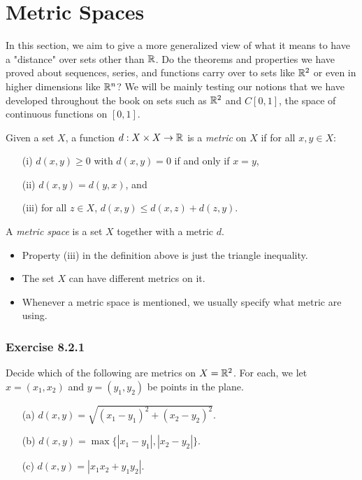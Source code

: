 \section{Metric Spaces}

In this section, we aim to give a more generalized view of what it means to have a "distance" over sets other than \( \mathbb{R}  \). Do the theorems and properties we have proved about sequences, series, and functions carry over to sets like \( \mathbb{R}^{2} \) or even in higher dimensions like \( \mathbb{R}^n \)? We will be mainly testing our notions that we have developed throughout the book on sets such as \( \mathbb{R}^{2} \) and \( C[0,1] \), the space of continuous functions on \( [0,1] \).


\begin{definition}
Given a set \( X  \), a function \( d: X \times X \to \mathbb{R}  \) is a \textit{metric} on \( X  \) if for all \( x,y \in X  \):
\begin{enumerate}
    \item[(i)]\( d(x,y) \geq 0  \) with \( d(x,y) =0  \) if and only if \( x = y  \),
    \item[(ii)] \( d(x,y) = d(y,x)  \), and 
    \item[(iii)] for all \( z \in X \), \( d(x,y) \leq d(x,z) + d(z,y) \).
\end{enumerate}
A \textit{metric space} is a set \( X  \) together with a metric \( d  \).
\end{definition}

\begin{itemize}
    \item Property (iii) in the definition above is just the triangle inequality.
    \item The set \( X  \) can have different metrics on it.
    \item Whenever a metric space is mentioned, we usually specify what metric are using.
\end{itemize}

\subsubsection{Exercise 8.2.1} Decide which of the following are metrics on \( X = \mathbb{R}^2  \). For each, we let \( x = (x_{1}, x_{2}) \) and \( y = (y_{1}, y_{2}) \) be points in the plane.
\begin{enumerate}
    \item[(a)] \( d(x,y) = \sqrt{ (x_{1}- y_{1})^2 + (x_{2} - y_{2})^{2} }. \)
    \item[(b)] \( d(x,y) = \max \{ | x_{1} - y_{1} |, | x_{2} - y_{2} |  \}. \)
    \item[(c)] \( d(x,y) = | x_{1} x_{2} + y_{1} y_{2} |  \).
\end{enumerate}

